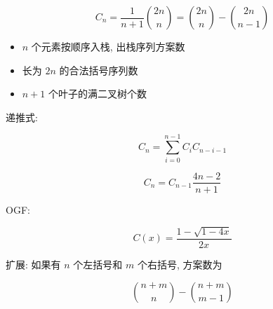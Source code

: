 \[
    C_n = \frac{1}{n + 1}\binom{2n}{n} = \binom{2n}{n} - \binom{2n}{n - 1}
\]

\begin{itemize}
    \item \(n\) 个元素按顺序入栈, 出栈序列方案数
    \item 长为 \(2n\) 的合法括号序列数
    \item \(n + 1\) 个叶子的满二叉树个数
\end{itemize}

递推式:

\[
    C_n = \sum_{i = 0} ^ {n - 1} C_i C_{n - i - 1}
\]

\[
    C_n = C_{n - 1} \frac {4n - 2} {n + 1}
\]

OGF:

\[
    C(x) = \frac{1 - \sqrt {1 - 4 x}}{2 x}
\]

扩展: 如果有 \(n\) 个左括号和 \(m\) 个右括号, 方案数为

\[
    \binom{n + m}{n} - \binom{n + m}{m - 1}
\]
